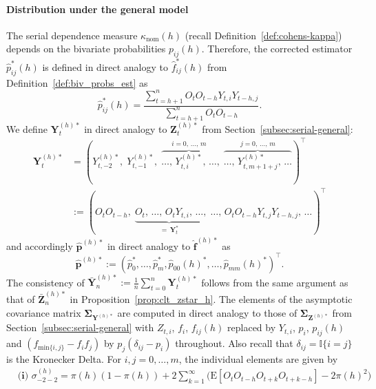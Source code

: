 ﻿\documentclass[12pt,a4paper]{scrreprt}
\theoremstyle{definition}
\begin{document}
\begin{appendices}
\paragraph{Distribution under the general model}
The serial dependence measure $\kappa_{\mathrm{nom}}(h)$ (recall Definition~\ref{def:cohens-kappa}) depends on the bivariate probabilities $p_{ij}(h)$.   
Therefore, the corrected estimator $\hat{p}_{ij}^*(h)$ is defined in direct analogy to $\hat{f}_{ij}^*(h)$ from Definition~\ref{def:biv_probs_est} as
\[\hat{p}_{ij}^*(h) = \frac{\sum_{t=h+1}^{n}O_t O_{t-h}Y_{t,i}Y_{t-h,j}}{\sum_{t=h+1}^{n}O_t O_{t-h}}.\]
We define $\boldsymbol{Y}^{(h)*}_t$ in direct analogy to \hyperref[eq:Z^h]{$\boldsymbol{Z}^{(h)*}_t$} from Section~\ref{subsec:serial-general}:
\begin{align*}
    \boldsymbol{Y}^{(h)*}_t 
    &= \left(
        Y_{t,-2}^{(h)*},\;
        Y_{t, -1}^{(h)*},\;
        \overbrace{\ldots,\, Y_{t,i}^{(h)*},\, \ldots}^{i=0,\,\ldots,\,m},\;
        \overbrace{\ldots,\, Y_{t,m+1+j}^{(h)*},\, \ldots}^{j=0,\,\ldots,\,m}
       \right)^\top\\
    &:= \left(
        O_t O_{t-h},\;
        \underbrace{O_t,\, \ldots,\, O_{t} Y_{t,i},\, \ldots}_{=\,\boldsymbol{Y}^*_t},\;
        \ldots,\, O_t O_{t-h} Y_{t,j} Y_{t-h,j},\, \ldots
        \right)^\top
\end{align*}
and accordingly $\hat{\boldsymbol{p}}^{(h)*}$ in direct analogy to \hyperref[def:f_h_hat]{$\hat{\boldsymbol{f}}^{(h)*}$} as
\[\hat{\boldsymbol{p}}^{(h)*} := \left(\hat{p}_0^{*}, \ldots, \hat{p}_m^{*}, \hat{p}_{00}(h)^{*}, \ldots, \hat{p}_{mm}(h)^{*}\right)^\top.\]
The consistency of $\bar{\boldsymbol{Y}}^{(h)*}_n := \frac{1}{n} \sum_{t = 0}^{n} \boldsymbol{Y}^{(h)*}_t$
follows from the same argument as that of $\bar{\boldsymbol{Z}}^{(h)*}_n$ in Proposition~\ref{prop:clt_zstar_h}. 
The elements of the asymptotic covariance matrix $\boldsymbol{\Sigma}_{\boldsymbol{Y}^{(h)*}}$ are 
computed in direct analogy to those of \hyperref[cal:Sigma_Zh]{$\boldsymbol{\Sigma}_{\boldsymbol{Z}^{(h)*}}$}
from  Section~\ref{subsec:serial-general} with $Z_{t,i}$, $f_i$, $f_{ij}(h)$ replaced by $Y_{t,i}$, $p_i$, $p_{ij}(h)$ and $(f_{\mathrm{min}\{i,j\}}- f_i f_j)$
by $p_j(\delta_{ij} - p_i)$ throughout. Also recall that $\delta_{ij} = \mathbb{I}\{i = j\}$ is the Kronecker Delta. For $i, j = 0, \ldots, m $, the individual elements are given by 
\begin{align*}
    &\textbf{(i) }\sigma_{-2-2}^{(h)} = \pi(h)(1-\pi(h)) + 2 \sum_{k=1}^{\infty} \biggl(\mathrm{E}[O_t O_{t-h}O_{t+k}O_{t+k-h}] -2\pi(h)^2\biggr) \\

\end{align*}
\end{appendices}
\end{document}
